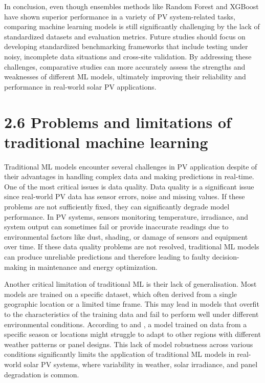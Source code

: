 In conclusion, even though ensembles methods like Random Forest and XGBoost have shown superior performance in a variety of PV system-related tasks, comparing machine learning models is still significantly challenging by the lack of standardized datasets and evaluation metrics. Future studies should focus on developing standardized benchmarking frameworks that include testing under noisy, incomplete data situations and cross-site validation. By addressing these challenges, comparative studies can more accurately assess the strengths and weaknesses of different ML models, ultimately improving their reliability and performance in real-world solar PV applications.

\section{2.6 Problems and limitations of traditional machine learning}
Traditional ML models encounter several challenges in PV application despite of their advantages in handling complex data and making predictions in real-time. One of the most critical issues is data quality. Data quality is a significant issue since real-world PV data has sensor errors, noise and missing values. If these problems are not sufficiently fixed, they can significantly degrade model performance. In PV systems, sensors monitoring temperature, irradiance, and system output can sometimes fail or provide inaccurate readings due to environmental factors like dust, shading, or damage of sensors and equipment over time. If these data quality problems are not resolved, traditional ML models can produce unreliable predictions and therefore leading to faulty decision-making in maintenance and energy optimization.

Another critical limitation of traditional ML is their lack of generalisation. Most models are trained on a specific dataset, which often derived from a single geographic location or a limited time frame. This may lead in models that overfit to the characteristics of the training data and fail to perform well under different environmental conditions. According to \parencite{Siddiqui et al._2020} and \parencite{Kumar et al._2020}, a model trained on data from a specific season or locations might struggle to adapt to other regions with different weather patterns or panel designs. This lack of model robustness across various conditions significantly limits the application of traditional ML models in real-world solar PV systems, where variability in weather, solar irradiance, and panel degradation is common. 

